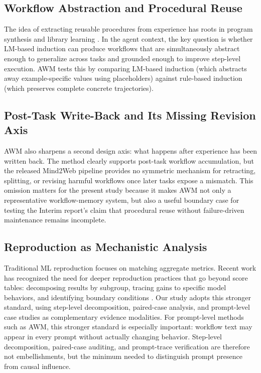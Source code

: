 \documentclass{article}
\begin{document}
\subsection{Workflow Abstraction and Procedural
Reuse}\label{workflow-abstraction-and-procedural-reuse}

The idea of extracting reusable procedures from experience has roots in
program synthesis and library learning
\parencite{ellis2023dreamcoder,grand2023lilo,bowers2023top}. In the
agent context, the key question
is whether LM-based induction can produce workflows that are
simultaneously abstract enough to generalize across tasks and grounded
enough to improve step-level execution. AWM tests this by comparing
LM-based induction (which abstracts away example-specific values using
placeholders) against rule-based induction (which preserves complete
concrete trajectories).

\subsection{Post-Task Write-Back and Its Missing Revision
Axis}\label{post-task-write-back-and-its-missing-revision-axis}

AWM also sharpens a second design axis: what happens after experience
has been written back. The method clearly supports post-task workflow
accumulation, but the released Mind2Web pipeline provides no symmetric
mechanism for retracting, splitting, or revising harmful workflows once
later tasks expose a mismatch. This omission matters for the present
study because it makes AWM not only a representative workflow-memory
system, but also a useful boundary case for testing the Interim report's
claim that procedural reuse without failure-driven maintenance remains
incomplete.

\subsection{Reproduction as Mechanistic
Analysis}\label{reproduction-as-mechanism-audit}

Traditional ML reproduction focuses on matching aggregate metrics.
Recent work has recognized the need for deeper reproduction practices
that go beyond score tables: decomposing results by subgroup, tracing
gains to specific model behaviors, and identifying boundary conditions
\parencite{dodge2019show,bouthillier2019unreproducible}. Our study adopts this
stronger standard, using step-level decomposition, paired-case analysis,
and prompt-level case studies as complementary evidence modalities. For
prompt-level methods such as AWM, this stronger standard is especially
important: workflow text may appear in every prompt without actually
changing behavior. Step-level decomposition, paired-case auditing, and
prompt-trace verification are therefore not embellishments, but the
minimum needed to distinguish prompt presence from causal influence.
\end{document}
